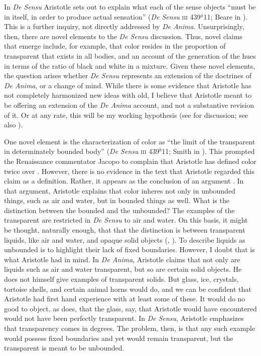 In \emph{De Sensu} Aristotle sets out to explain what each of the sense objects ``must be in itself, in order to produce actual sensation'' (\emph{De Sensu} \textsc{iii} 439\( ^{a} \)11; Beare in \citealt[7]{Barnes:1984uq}). This is a further inquiry, not directly addressed by \emph{De Anima}. Unsurprisingly, then, there are novel elements to the \emph{De Sensu} discussion. Thus, novel claims that emerge include, for example, that color resides in the proportion of transparent that exists in all bodies, and an account of the generation of the hues in terms of the ratio of black and white in a mixture. Given these novel elements, the question arises whether \emph{De Sensu} represents an extension of the doctrines of \emph{De Anima}, or a change of mind. While there is some evidence that Aristotle has not completely harmonized new ideas with old, I believe that Aristotle meant to be offering an extension of the \emph{De Anima} account, and not a substantive revision of it. Or at any rate, this will be my working hypothesis (see \citealt{Kahn:1966zr} for discussion; see also \citealt[291]{Caston:2005cr} \citealt[37]{Nussbaum:1995ly}).

One novel element is the characterization of color as ``the limit of the transparent in determinately bounded body'' (\emph{De Sensu} \textsc{iii} 439\( ^{b} \)11; Smith in \citealt[8]{Barnes:1984uq}). This prompted the Renaissance commentator Jacopo \citet{Zabarella:1605kx} to complain that Aristotle has defined color twice over \citep{Broackes:1999uq}. However, there is no evidence in the text that Aristotle regarded this claim as a definition. Rather, it appears as the conclusion of an argument \citep[65]{Broackes:1999uq}. In that argument, Aristotle explains that color inheres not only in unbounded things, such as air and water, but in bounded things as well. What is the distinction between the bounded and the unbounded? The examples of the transparent are restricted in \emph{De Sensu} to air and water. On this basis, it might be thought, naturally enough, that that the distinction is between transparent liquids, like air and water, and opaque solid objects (\citealt[59]{Broackes:1999uq}, \citealt[131]{Sorabji:2004fk}). To describe liquids as unbounded is to highlight their lack of fixed boundaries. However, I doubt that is what Aristotle had in mind. In \emph{De Anima}, Aristotle claims that not only are liquids such as air and water transparent, but so are certain solid objects. He does not himself give examples of transparent solids. But glass, ice, crystals, tortoise shells, and certain animal horns would do, and we can be confident that Aristotle had first hand experience with at least some of these. It would do no good to object, as \citet[131]{Sorabji:2004fk} does, that the glass, say, that Aristotle would have encountered would not have been perfectly transparent. In \emph{De Sensu}, Aristotle emphasizes that transparency comes in degrees. The problem, then, is that any such example would possess fixed boundaries and yet would remain transparent, but the transparent is meant to be unbounded. 

